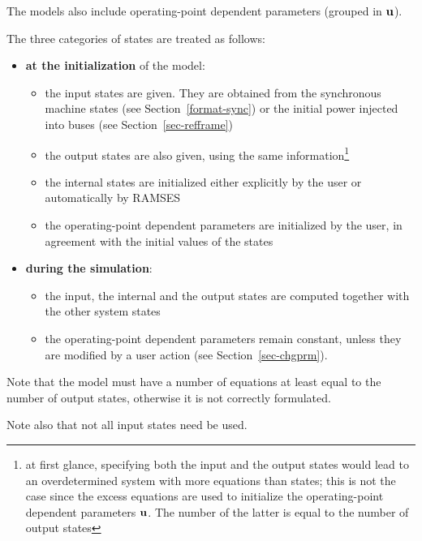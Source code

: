 The models also include operating-point dependent parameters (grouped in $\bf u$).

The three categories of states are treated as follows:
\begin{itemize}
\item {\bf \large at the initialization} of the model: 
\begin{itemize}
\item the input states are given. They are obtained from the synchronous machine states (see Section~\ref{format-sync}) or the initial power injected into buses (see Section~\ref{sec-refframe})
\item the output states are also given, using the same information\footnote{at first glance, specifying both the input and the output states would lead to an overdetermined system with more equations than states; this is not the case since the excess equations are used to initialize the operating-point dependent parameters $\bf u$. The number of the latter is equal to the number of output states}
\item the internal states are initialized either explicitly by the user or automatically by RAMSES
\item the operating-point dependent parameters are initialized by the user, in agreement with the initial values of the states
\end{itemize}
\item {\bf \large during the simulation}:
\begin{itemize}
\item the input, the internal and the output states are computed together with the other system states
\item the operating-point dependent parameters remain constant, unless they are modified by a user action (see Section~\ref{sec-chgprm}).
\end{itemize}
\end{itemize}

Note that the model must have a number of equations at least equal to the number of output states, otherwise it is not correctly formulated.

Note also that not all input states need be used.

